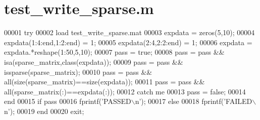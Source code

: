 \hypertarget{test__write__sparse_8m_source}{}\section{test\+\_\+write\+\_\+sparse.\+m}
\label{test__write__sparse_8m_source}

\begin{DoxyCode}
00001 \textcolor{keywordflow}{try}
00002     load test\_write\_sparse.mat
00003     expdata = zeros(5,10);
00004     expdata(1:4:end,1:2:end) = 1;
00005     expdata(2:4,2:2:end) = 1;
00006     expdata = expdata.*reshape(1:50,5,10);
00007     pass = \textcolor{keyword}{true};
00008     pass = pass && isa(sparse\_matrix,\textcolor{keyword}{class}(expdata));
00009     pass = pass && issparse(sparse\_matrix);
00010     pass = pass && all(size(sparse\_matrix)==size(expdata));
00011     pass = pass && all(sparse\_matrix(:)==expdata(:));
00012 \textcolor{keywordflow}{catch} me
00013     pass = \textcolor{keyword}{false};
00014 end
00015 \textcolor{keywordflow}{if} pass
00016     fprintf(\textcolor{stringliteral}{'PASSED\(\backslash\)n'});
00017 \textcolor{keywordflow}{else}
00018     fprintf(\textcolor{stringliteral}{'FAILED\(\backslash\)n'});
00019 end
00020 exit;
\end{DoxyCode}
